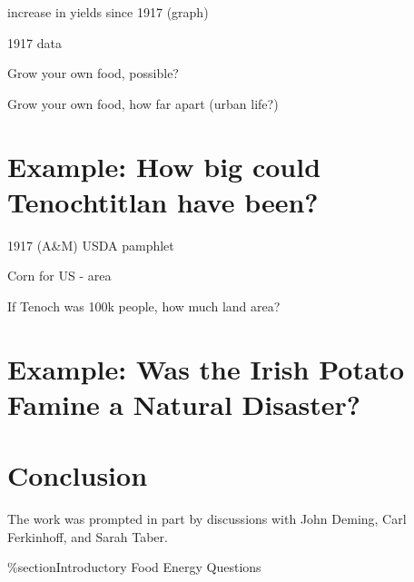 \documentclass[12pt]{iopart}
\begin{document}
increase in yields since 1917 (graph)

1917 data

Grow your own food, possible?  

Grow your own food, how far apart (urban life?)


\section{Example: How big could Tenochtitlan have been?}

1917 (A\&M) USDA pamphlet

Corn for US - area

If Tenoch was 100k people, how much land area?

\section{Example: Was the Irish Potato Famine a Natural Disaster?}

\section{Conclusion}


\ack
The work was prompted in part by discussions with John Deming, Carl Ferkinhoff, and Sarah Taber.

\%section{Introductory Food Energy Questions}
\end{document}
